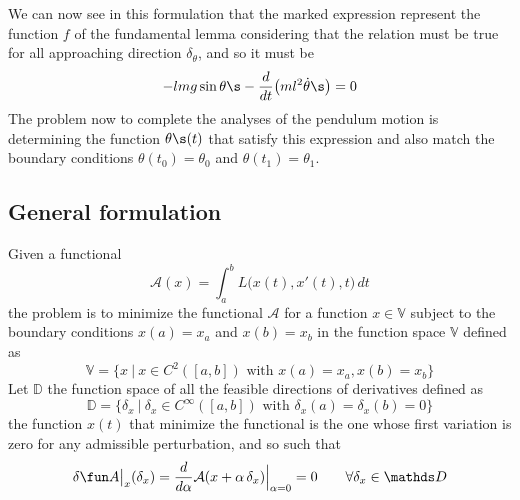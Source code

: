 We can now see in this formulation that the marked expression represent the function $f$ of the fundamental lemma considering that the relation must be true for all approaching direction $\delta_\theta$, and so it must be
\[ -lmg \sin\theta\s - \frac d{dt}\big(ml^2 \dot\theta\s\big) = 0 \]
The problem now to complete the analyses of the pendulum motion is determining the function $\theta\s(t)$ that satisfy this expression and also match the boundary conditions $\theta(t_0) = \theta_0$ and $\theta(t_1)=\theta_1$.

\subsection{General formulation} \label{sec:func:eullag}
Given a functional
\begin{equation}
	\mathcal A(x) = \int_a^b L \big(x(t),x'(t),t\big)\, dt
\end{equation}
the problem is to minimize the functional $\mathcal A$ for a function $x \in \mathds V$ subject to the boundary conditions $x(a) = x_a$ and $x(b) = x_b$ in the function space $\mathds V$ defined as
\[ \mathds V = \big\{ x \ | \ x\in C^2([a,b]) \textrm{ with } x(a) = x_a,x(b) = x_b \big\} \]
Let $\mathds D$ the function space of all the feasible directions of derivatives defined as
\[ \mathds D = \big\{ \delta_x \ | \ \delta_x \in C^{\infty}([a,b]) \textrm{ with } \delta_x(a) = \delta_x(b) = 0 \big\} \]
the function $x(t)$ that minimize the functional is the one whose first variation is zero for any admissible perturbation, and so such that
\[ \delta \fun A\big|_x(\delta_x) = \frac{d}{d\alpha} \mathcal{A}(x+\alpha\, \delta_x) \Big|_{\alpha = 0} = 0 \qquad \forall \delta_x \in \mathds D \]	

